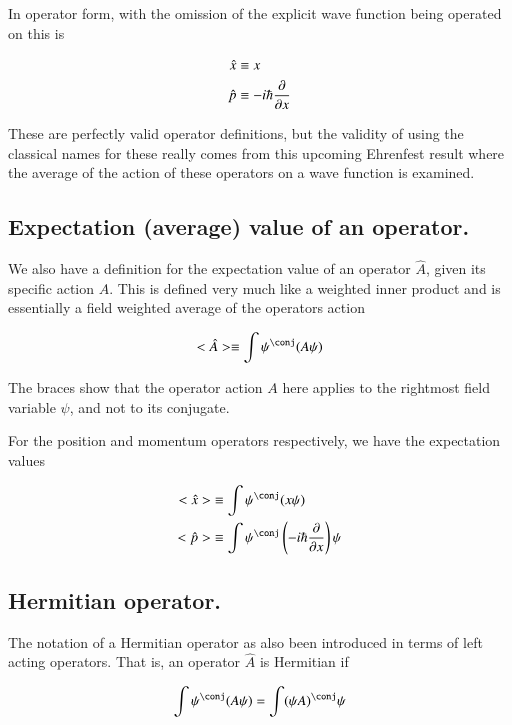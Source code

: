 In operator form, with the omission of the explicit wave function being operated on this is

\begin{align*}
\hat{x} &\equiv x  \\
\hat{p} &\equiv -i \hbar \frac{\partial {}}{\partial {x}}
\end{align*}

These are perfectly valid operator definitions, but the validity of using the 
classical names for these really comes from this upcoming Ehrenfest result where
the average of the action of these operators on a wave function is examined.

\subsection{Expectation (average) value of an operator. }

We also have a definition for the expectation value
of an operator $\hat{A}$, given its specific action $A$.
This is defined very much like a weighted inner product
and is essentially a field weighted average of the operators action

\begin{align*}
<\hat{A}> \equiv \int \psi^\conj (A \psi)
\end{align*}

The braces show that the operator action $A$ here applies to the rightmost field variable $\psi$, and not to its conjugate.

For the position and momentum operators respectively, we have the
expectation values

\begin{align*}
<\hat{x}> &\equiv \int \psi^\conj (x \psi) \\
<\hat{p}> &\equiv \int \psi^\conj \left(-i \hbar \PD{x}{}\right) \psi
\end{align*}

\subsection{Hermitian operator. }

The notation of a Hermitian operator as also been introduced in terms of 
left acting operators.  That is, an operator $\hat{A}$ is Hermitian if

\begin{align}\label{eqn:ehrenfest:hermitian1}
\int \psi^\conj (A \psi) = \int (\psi A)^\conj \psi
\end{align}

